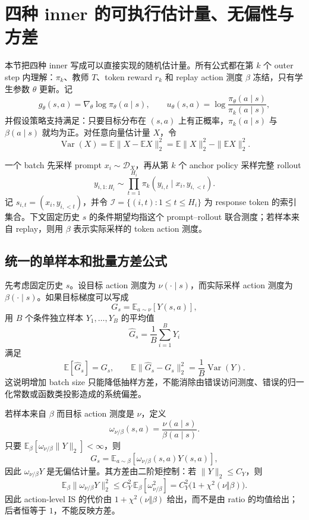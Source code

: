 \section{四种 inner 的可执行估计量、无偏性与方差}
\label{sec:ch2-estimator-theory}

本节把四种 inner 写成可以直接实现的随机估计量。所有公式都在第 $k$ 个 outer step 内理解：$\pi_k$、教师 $T$、token reward $r_k$ 和 replay action 测度 $\beta$ 冻结，只有学生参数 $\theta$ 更新。记
\[
 g_\theta(s,a)=\nabla_\theta\log\pi_\theta(a\mid s),
 \qquad
 u_\theta(s,a)=\log\frac{\pi_\theta(a\mid s)}{\pi_k(a\mid s)},
\]
并假设策略支持满足：只要目标分布在 $(s,a)$ 上有正概率，$\pi_k(a\mid s)$ 与 $\beta(a\mid s)$ 就均为正。对任意向量估计量 $X$，令
\[
 \operatorname{Var}(X)=\mathbb E\|X-\mathbb E X\|_2^2
 =\mathbb E\|X\|_2^2-\|\mathbb E X\|_2^2.
\]

一个 batch 先采样 prompt $x_i\sim\mathcal D_X$，再从第 $k$ 个 anchor policy 采样完整 rollout
\[
 y_{i,1:H_i}\sim\prod_{t=1}^{H_i}\pi_k(y_{i,t}\mid x_i,y_{i,<t}).
\]
记 $s_{i,t}=(x_i,y_{i,<t})$，并令 $\mathcal I=\{(i,t):1\le t\le H_i\}$ 为 response token 的索引集合。下文固定历史 $s$ 的条件期望均指这个 prompt--rollout 联合测度；若样本来自 replay，则用 $\beta$ 表示实际采样的 token action 测度。

\subsection{统一的单样本和批量方差公式}
\label{subsec:unified-estimator-variance}

先考虑固定历史 $s$。设目标 action 测度为 $\nu(\cdot\mid s)$，而实际采样 action 测度为 $\beta(\cdot\mid s)$。如果目标梯度可以写成
\[
 G_s=\mathbb E_{a\sim\nu}[Y(s,a)],
\]
用 $B$ 个条件独立样本 $Y_1,\ldots,Y_B$ 的平均值
\[
 \widehat G_s=\frac1B\sum_{i=1}^B Y_i
\]
满足
\begin{equation}
\label{eq:inner-unbiased-mean}
 \mathbb E[\widehat G_s]=G_s,
 \qquad
 \mathbb E\|\widehat G_s-G_s\|_2^2
 =\frac1B\operatorname{Var}(Y).
\end{equation}
这说明增加 batch size 只能降低抽样方差，不能消除由错误访问测度、错误的归一化常数或函数类投影造成的系统偏差。

若样本来自 $\beta$ 而目标 action 测度是 $\nu$，定义
\[
 \omega_{\nu/\beta}(s,a)=\frac{\nu(a\mid s)}{\beta(a\mid s)}.
\]
只要 $\mathbb E_\beta[\omega_{\nu/\beta}\|Y\|_2]<\infty$，则
\[
 G_s=\mathbb E_{a\sim\beta}[\omega_{\nu/\beta}(s,a)Y(s,a)],
\]
因此 $\omega_{\nu/\beta}Y$ 是无偏估计量。其方差由二阶矩控制：若 $\|Y\|_2\leq C_Y$，则
\begin{equation}
\label{eq:inner-is-second-moment}
 \mathbb E_\beta\|\omega_{\nu/\beta}Y\|_2^2
 \leq C_Y^2\,\mathbb E_\beta[\omega_{\nu/\beta}^2]
 =C_Y^2\bigl(1+\chi^2(\nu\Vert\beta)\bigr).
\end{equation}
因此 action-level IS 的代价由 $1+\chi^2(\nu\Vert\beta)$ 给出，而不是由 ratio 的均值给出；后者恒等于 $1$，不能反映方差。

